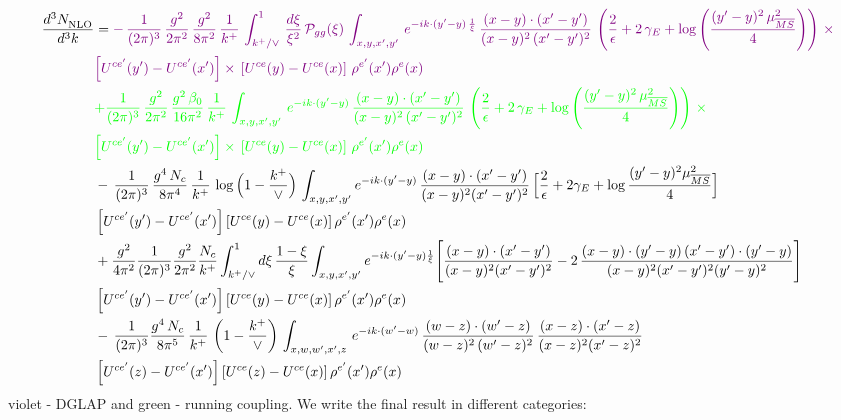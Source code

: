 \documentclass[9pt]{article}
\numberwithin{equation}{section}
\begin{document}
\begin{align} \label{eq:master}
\frac{d^{3}N_{\rm NLO}^{\rm}}{d^{3}k}  & =
   {\color{violet} -\,\frac{1}{(2\pi)^{3}}\,\frac{g^{2}}{2\pi^{2}}\,\frac{g^{2}}{8\pi^{2}}\,\frac{1}{k^{+}}\,\int_{k^{+}/\vee}^{1}\, \frac{d\xi}{\xi^{2}}\,\mathcal{P}_{gg}(\xi)\,\int_{x,y,x',y'}\, e^{-ik\cdot (y'-y)\,\frac{1}{\xi}}\, \frac{(x-y)\cdot (x'-y')}{(x-y)^{2}\,(x'-y')^{2}}\,\left(\frac{2}{\epsilon}+2\,\gamma_{E}+\log{\left(\frac{(y'-y)^{2}\,\mu^{2}_{\overline{MS}}}{4}\right)}\right)\,\times}\notag \\ &  {\color{violet}\left[U^{ce'}(y') - U^{ce'}(x')\right] \times\, \left[U^{ce}(y) - U^{ce}(x)\right]\, \rho^{e'}(x') \rho^{e}(x)}
    \notag \\ & {\color{green}+\frac{1}{(2\pi)^{3}}\, \frac{g^{2}}{2\pi^{2}}\,\frac{g^{2}\,\beta_{0}}{16\pi^{2}}\, \frac{1}{k^{+}}\,\int_{x,y,x',y'}\, e^{-ik\cdot (y'-y)}\, \frac{(x-y)\cdot (x'-y')}{(x-y)^{2}\,(x'-y')^{2}}\,\left(\frac{2}{\epsilon}+2\,\gamma_{E}+\log{\left(\frac{(y'-y)^{2}\,\mu^{2}_{\overline{MS}}}{4}\right)}\right)\,\times}\notag \\ &  {\color{green}\left[U^{ce'}(y') - U^{ce'}(x')\right] \times\, \left[U^{ce}(y) - U^{ce}(x)\right]\, \rho^{e'}(x') \rho^{e}(x)}\notag \\ &
-\,\frac{1}{(2\pi)^{3}}\,\frac{g^{4}\,N_{c}}{8\pi^{4}}\,\frac{1}{k^{+}}\,\log\Big(1-\frac{k^{+}}{\vee}\Big)\,\int_{x,y,x',y'}e^{-ik\cdot(y'-y)}\,\frac{(x-y)\cdot(x'-y')}{(x-y)^{2}(x'-y')^{2}}\,\Big[\frac{2}{\epsilon}+2\gamma_{E}+\log\frac{(y'-y)^{2}\mu^{2}_{\overline{MS}}}{4}\Big]\notag \\ & \left[U^{ce'}(y')-U^{ce'}(x')\right]\left[U^{ce}(y)-U^{ce}(x)\right]\rho^{e'}(x')\rho^{e}(x)\notag\\
&+\frac{g^{2}}{4\pi^{2}}\frac{1}{(2\pi)^{3}}\frac{g^{2}}{2\pi^{2}}\frac{N_{c}}{k^{+}}\int_{k^{+}/\vee}^{1}d\xi\,\frac{1-\xi}{\xi}\int_{x,y,x',y'}e^{-ik\cdot(y'-y)\frac{1}{\xi}}\Bigg[\frac{(x-y)\cdot(x'-y')}{(x-y)^{2}(x'-y')^{2}}-2\,\frac{(x-y)\cdot(y'-y)\,(x'-y')\cdot(y'-y)}{(x-y)^{2}(x'-y')^{2}(y'-y)^{2}}\Bigg]\notag \\ & \left[U^{ce'}(y')-U^{ce'}(x')\right]\left[U^{ce}(y)-U^{ce}(x)\right]\rho^{e'}(x')\rho^{e}(x)\notag \\ & -\,\frac{1}{(2\pi)^{3}}\frac{g^{4}\,N_{c}}{8\pi^{5}}\,\frac{1}{k^{+}}\, \left(1-\frac{k^{+}}{\vee}\right)\,\int_{x,w,w',x',z}\,e^{-ik\cdot(w'-w)}\,\frac{(w-z)\cdot (w'-z)}{(w-z)^{2}\, (w'-z)^{2}}\,\frac{(x-z)\cdot(x'-z)}{(x-z)^{2}(x'-z)^{2}}\notag \\ & \left[U^{ce'}(z)-U^{ce'}(x')\right]\left[U^{ce}(z)-U^{ce}(x)\right]\rho^{e'}(x')\rho^{e}(x)
\end{align}
{\color{violet} violet - DGLAP} and {\color{green} green - running coupling}. We write the
final result in different categories:
\end{document}
